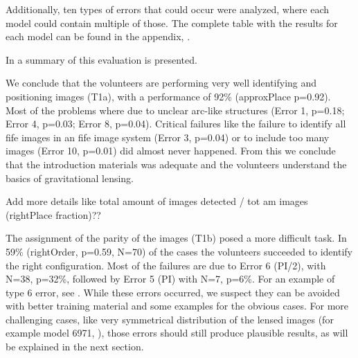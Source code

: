 Additionally, ten types of errors that could occur were analyzed, where each model could contain multiple of those.
The complete table with the results for each model can be found in the appendix, .

In  a summary of this evaluation is presented.





We conclude that the volunteers are performing very well identifying and positioning images (T1a), with a performance of 92\% (approxPlace p=0.92).
Most of the problems where due to unclear arc-like structures (Error 1, p=0.18; Error 4, p=0.03; Error 8, p=0.04).
Critical failures like the failure to identify all fife images in an fife image system (Error 3, p=0.04) or to include too many images (Error 10, p=0.01) did almost never happened.
From this we conclude that the introduction materials was adequate and the volunteers understand the basics of gravitational lensing.

 Add more details like total amount of images detected / tot am images (rightPlace fraction)??

The assignment of the parity of the images (T1b) posed a more difficult task.
In 59\% (rightOrder, p=0.59, N=70) of the cases the volunteers succeeded to identify the right configuration.
Most of the failures are due to Error 6 (PI/2), with N=38, p=32\%, followed by Error 5 (PI) with N=7, p=6\%.
For an example of type 6 error, see .
While these errors occurred, we suspect they can be avoided with better training material and some examples for the obvious cases.
For more challenging cases, like very symmetrical distribution of the lensed images (for example model 6971, ), those errors should still produce plausible results, as will be explained in the next section.








